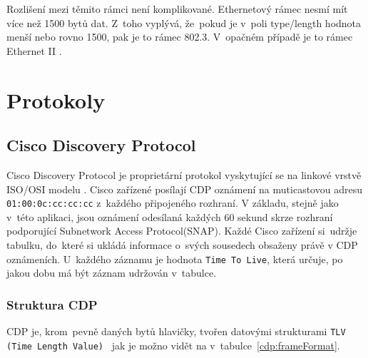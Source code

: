 \documentclass[a4paper,12pt]{article}
\begin{document}
		Rozlišení mezi těmito rámci není komplikované. Ethernetový rámec nesmí mít více než 1500 bytů dat. Z~toho vyplývá, že~pokud je v~poli type/length hodnota menší nebo rovno 1500, pak je to rámec 802.3. V~opačném případě je to rámec Ethernet II \cite{wireshark:ethernet}. 
	
	\section{Protokoly}	
		\subsection{Cisco Discovery Protocol}\label{cdp}
			Cisco Discovery Protocol je proprietární protokol vyskytující se na linkové vrstvě \cite{wiki:cdp} ISO/OSI modelu \cite{wiki:iso/osi}. Cisco zařízené posílají CDP oznámení na muticastovou adresu \texttt{01:00:0c:cc:cc:cc} z~každého připojeného rozhraní. V základu, stejně jako v~této aplikaci, jsou oznámení odesílaná každých 60 sekund skrze rozhraní podporující Subnetwork Access Protocol(SNAP). Každé Cisco zařízení si~udržje tabulku, do~které si ukládá informace o~svých sousedech obsaženy právě v CDP oznámeních. U~každého záznamu je hodnota \texttt{Time To Live}, která určuje, po jakou dobu má být záznam udržován v~tabulce.
			
			\subsubsection{Struktura CDP}
				CDP je, krom~pevně daných bytů hlavičky, tvořen datovými strukturami \texttt{TLV (Time Length Value)}~\cite{technion:cdp} jak je možno vidět na v~tabulce~\ref{cdp:frameFormat}.
				
		
				\begin{table}[h]
					\begin{center}
						\caption{Struktura protokolu CDP}\label{cdp:frameFormat}
						
						
						
					\end{center}
				\end{table}
				
\end{document}
